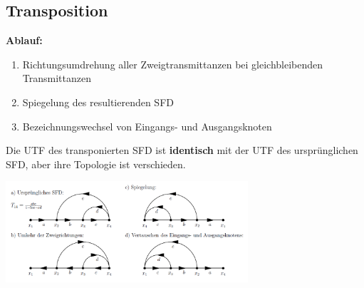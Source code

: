 \subsection{Transposition }
  \begin{multicols}{2}
    \textbf{Ablauf:}
    \begin{enumerate}
      \item Richtungsumdrehung aller Zweigtransmittanzen bei gleichbleibenden Transmittanzen
      \item Spiegelung des resultierenden SFD
      \item Bezeichnungswechsel von Eingangs- und Ausgangsknoten
    \end{enumerate}
    
    Die UTF des transponierten SFD ist \textbf{identisch} mit der UTF des ursprünglichen SFD, aber ihre
    Topologie ist verschieden.
    
  \columnbreak
    \includegraphics[width=9cm]{./bilder/transposition.png}
  \end{multicols}

